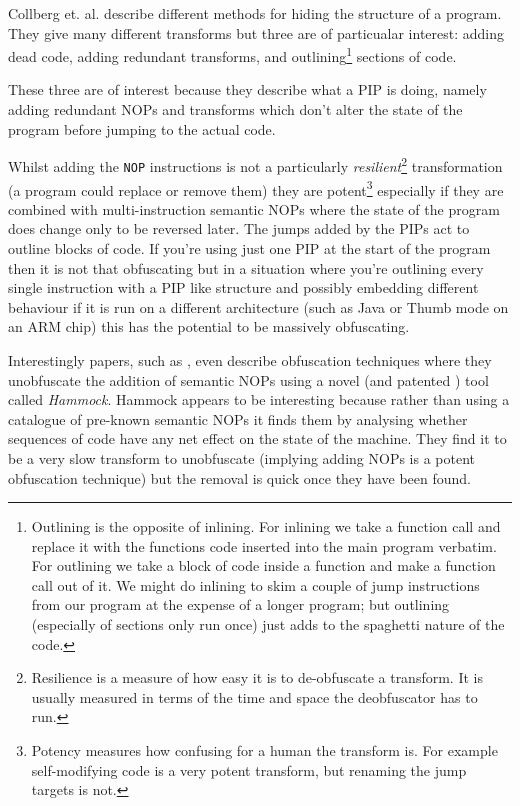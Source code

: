 \documentclass[10pt,]{book}
\begin{document}
Collberg et. al. \autocite{Collberg:1997vt} describe different methods
for hiding the structure of a program. They give many different
transforms but three are of particualar interest: adding dead code,
adding redundant transforms, and outlining\footnote{Outlining is the
  opposite of inlining. For inlining we take a function call and replace
  it with the functions code inserted into the main program verbatim.
  For outlining we take a block of code inside a function and make a
  function call out of it. We might do inlining to skim a couple of jump
  instructions from our program at the expense of a longer program; but
  outlining (especially of sections only run once) just adds to the
  spaghetti nature of the code.} sections of code.

These three are of interest because they describe what a PIP is doing,
namely adding redundant NOPs and transforms which don't alter the state
of the program before jumping to the actual code.

Whilst adding the \lstinline!NOP! instructions is not a particularly
\emph{resilient}\footnote{Resilience is a measure of how easy it is to
  de-obfuscate a transform. It is usually measured in terms of the time
  and space the deobfuscator has to run.} transformation (a program
could replace or remove them) they are potent\footnote{Potency measures
  how confusing for a human the transform is. For example self-modifying
  code is a very potent transform, but renaming the jump targets is not.}
especially if they are combined with multi-instruction semantic NOPs
where the state of the program does change only to be reversed later.
The jumps added by the PIPs act to outline blocks of code. If you're
using just one PIP at the start of the program then it is not that
obfuscating but in a situation where you're outlining every single
instruction with a PIP like structure and possibly embedding different
behaviour if it is run on a different architecture (such as Java or
Thumb mode on an ARM chip) this has the potential to be massively
obfuscating.

Interestingly papers, such as
\autocite{Christodorescu:2005vh}\autocite{Christodorescu:2005vf}, even
describe obfuscation techniques where they unobfuscate the addition of
semantic NOPs using a novel (and patented
\autocite{Christodorescu:2009wo}) tool called \emph{Hammock}. Hammock
appears to be interesting because rather than using a catalogue of
pre-known semantic NOPs it finds them by analysing whether sequences of
code have any net effect on the state of the machine. They find it to be
a very slow transform to unobfuscate (implying adding NOPs is a potent
obfuscation technique) but the removal is quick once they have been
found.
\end{document}
